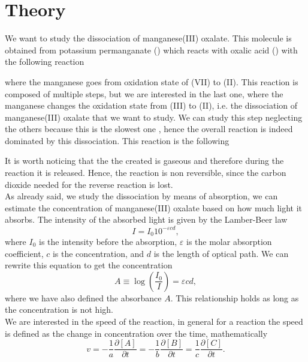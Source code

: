 \documentclass[a4paper,10pt]{article}
\begin{document}
\section{Theory}
We want to study the dissociation of manganese(III) oxalate. This molecule is obtained from potassium permanganate () which reacts with oxalic acid () with the following reaction
\begin{center}
\end{center} 
where the manganese goes from oxidation state of (VII) to (II). This reaction is composed of multiple steps, but we are interested in the last one, where the manganese changes the oxidation state from (III) to (II), i.e. the dissociation of manganese(III) oxalate that we want to study. We can study this step neglecting the others because this is the slowest one \cite{manganese}, hence the overall reaction is indeed dominated by this dissociation. This reaction is the following \cite{taube}
\begin{center}
\end{center} 
It is worth noticing that the the  created is gaseous and therefore during the reaction it is released. Hence, the reaction is non reversible, since the carbon dioxide needed for the reverse reaction is lost.\\
As already said, we study the dissociation by means of absorption, we can estimate the concentration of manganese(III) oxalate based on how much light it absorbs. The intensity of the absorbed light is given by the Lamber-Beer law
\begin{equation}I = I_0 10^{-\varepsilon c d },\end{equation}
where $I_0$ is the intensity before the absorption, $\varepsilon$ is the molar absorption coefficient, $c$ is the concentration, and $d$ is the length of optical path. We can rewrite this equation to get the concentration
\begin{equation}\label{absorbance}A \equiv \log\left(\frac{I_0}{I}\right) = \varepsilon c d,\end{equation}
where we have also defined the absorbance $A$. This relationship holds as long as the concentration is not high.\\
We are interested in the speed of the reaction, in general for a reaction  the speed is defined as the change in concentration over the time, mathematically
\begin{equation}v = -\frac{1}{a}\frac{\partial[A]}{\partial t} = -\frac{1}{b}\frac{\partial[B]}{\partial t} = \frac{1}{c}\frac{\partial[C]}{\partial t}.\end{equation}
\end{document}
